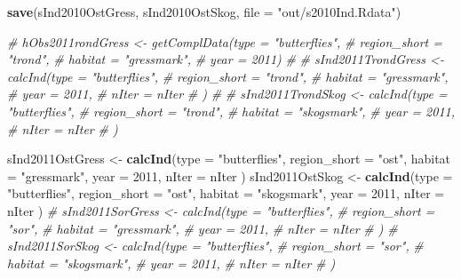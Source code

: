 \documentclass[]{article}
\newenvironment{Shaded}{\begin{snugshade}}{\end{snugshade}}
\newcommand{\KeywordTok}[1]{\textcolor[rgb]{0.13,0.29,0.53}{\textbf{#1}}}
\newcommand{\DataTypeTok}[1]{\textcolor[rgb]{0.13,0.29,0.53}{#1}}
\newcommand{\DecValTok}[1]{\textcolor[rgb]{0.00,0.00,0.81}{#1}}
\newcommand{\StringTok}[1]{\textcolor[rgb]{0.31,0.60,0.02}{#1}}
\newcommand{\CommentTok}[1]{\textcolor[rgb]{0.56,0.35,0.01}{\textit{#1}}}
\newcommand{\NormalTok}[1]{#1}
\begin{document}
\begin{Shaded}
\begin{Highlighting}[]
\KeywordTok{save}\NormalTok{(sInd2010OstGress, sInd2010OstSkog, }\DataTypeTok{file =} \StringTok{"out/s2010Ind.Rdata"}\NormalTok{)}
\end{Highlighting}
\end{Shaded}

\begin{Shaded}
\begin{Highlighting}[]
\CommentTok{# hObs2011rondGress <- getComplData(type = "butterflies",}
\CommentTok{#                                    region_short = "trond",}
\CommentTok{#                                    habitat = "gressmark",}
\CommentTok{#                                    year = 2011)}
\CommentTok{# }
\CommentTok{# sInd2011TrondGress <- calcInd(type = "butterflies",}
\CommentTok{#                               region_short = "trond",}
\CommentTok{#                               habitat = "gressmark",}
\CommentTok{#                               year = 2011,}
\CommentTok{#                               nIter = nIter}
\CommentTok{#                               )}
\CommentTok{#        }
\CommentTok{# sInd2011TrondSkog <- calcInd(type = "butterflies",}
\CommentTok{#                               region_short = "trond",}
\CommentTok{#                               habitat = "skogsmark",}
\CommentTok{#                               year = 2011,}
\CommentTok{#                               nIter = nIter}
\CommentTok{#                               )}

\NormalTok{sInd2011OstGress <-}\StringTok{ }\KeywordTok{calcInd}\NormalTok{(}\DataTypeTok{type =} \StringTok{"butterflies"}\NormalTok{,}
                              \DataTypeTok{region_short =} \StringTok{"ost"}\NormalTok{,}
                              \DataTypeTok{habitat =} \StringTok{"gressmark"}\NormalTok{,}
                              \DataTypeTok{year =} \DecValTok{2011}\NormalTok{,}
                              \DataTypeTok{nIter =}\NormalTok{ nIter}
\NormalTok{                              )}
\NormalTok{sInd2011OstSkog <-}\StringTok{ }\KeywordTok{calcInd}\NormalTok{(}\DataTypeTok{type =} \StringTok{"butterflies"}\NormalTok{,}
                              \DataTypeTok{region_short =} \StringTok{"ost"}\NormalTok{,}
                              \DataTypeTok{habitat =} \StringTok{"skogsmark"}\NormalTok{,}
                              \DataTypeTok{year =} \DecValTok{2011}\NormalTok{,}
                              \DataTypeTok{nIter =}\NormalTok{ nIter}
\NormalTok{                              )}
\CommentTok{# sInd2011SorGress <- calcInd(type = "butterflies",}
\CommentTok{#                               region_short = "sor",}
\CommentTok{#                               habitat = "gressmark",}
\CommentTok{#                               year = 2011,}
\CommentTok{#                               nIter = nIter}
\CommentTok{#                               )}
\CommentTok{# sInd2011SorSkog <- calcInd(type = "butterflies",}
\CommentTok{#                               region_short = "sor",}
\CommentTok{#                               habitat = "skogsmark",}
\CommentTok{#                               year = 2011,}
\CommentTok{#                               nIter = nIter}
\CommentTok{#                               )}


\end{Highlighting}
\end{Shaded}
\end{document}
